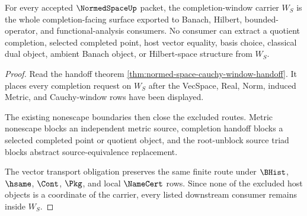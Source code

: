 \begin{theorem}
\label{thm:normed-space-completion-window-nonescape}
For every accepted $\NormedSpaceUp$ packet, the completion-window carrier $W_S$ is the whole completion-facing surface exported to Banach, Hilbert, bounded-operator, and functional-analysis consumers. No consumer can extract a quotient completion, selected completed point, host vector equality, basis choice, classical dual object, ambient Banach object, or Hilbert-space structure from $W_S$.
\end{theorem}
\begin{proof}
Read the handoff theorem \autoref{thm:normed-space-cauchy-window-handoff}. It places every completion request on $W_S$ after the VecSpace, Real, Norm, induced Metric, and Cauchy-window rows have been displayed.

The existing nonescape boundaries then close the excluded routes. Metric nonescape blocks an independent metric source, completion handoff blocks a selected completed point or quotient object, and the root-unblock source triad blocks abstract source-equivalence replacement.

The vector transport obligation preserves the same finite route under $\BHist$, $\hsame$, $\Cont$, $\Pkg$, and local $\NameCert$ rows. Since none of the excluded host objects is a coordinate of the carrier, every listed downstream consumer remains inside $W_S$.
\end{proof}

